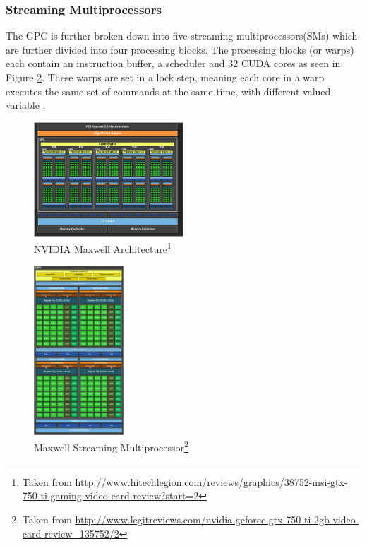 \subsubsection{Streaming Multiprocessors}\label{gpu:ssec:smm}
The GPC is further broken down into five streaming multiprocessors(SMs) which are further divided into four processing blocks. The processing blocks (or warps) each contain an instruction buffer, a scheduler and 32 CUDA cores as seen in Figure \ref{gpu:img:smm}. These warps are set in a lock step, meaning each core in a warp executes the same set of commands at the same time, with different valued variable \citep{CUDA_DEVKIT}.
%
\begin{figure}[H]
 \centering
 \includegraphics[width=0.5\textwidth]{Images/GM107.jpg}
 \caption[]{NVIDIA Maxwell Architecture\footnote{Taken from \url{http://www.hitechlegion.com/reviews/graphics/38752-msi-gtx-750-ti-gaming-video-card-review?start=2}}}
 \label{gpu:img:gm107}
\end{figure}
%
\begin{figure}[H]
\centering
 \includegraphics[width=0.3\textwidth]{Images/GM107SMM.png}
 \caption[]{Maxwell Streaming Multiprocessor\footnote{Taken from \url{http://www.legitreviews.com/nvidia-geforce-gtx-750-ti-2gb-video-card-review_135752/2}}}
 \label{gpu:img:smm}
\end{figure}
